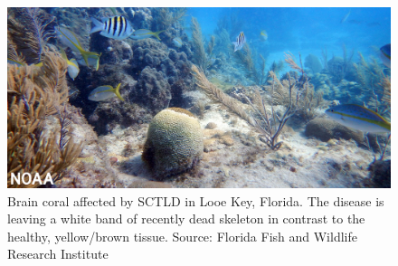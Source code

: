 \begin{figure}
    \centering
    \includegraphics[width=\textwidth]{chapters/intro/figures/sctld.jpg}
    \caption{Brain coral affected by SCTLD in Looe Key, Florida. The disease is leaving a white band of recently dead skeleton in contrast to the healthy, yellow/brown tissue. Source: Florida Fish and Wildlife Research Institute}
    \label{intro:sctld}
\end{figure}


